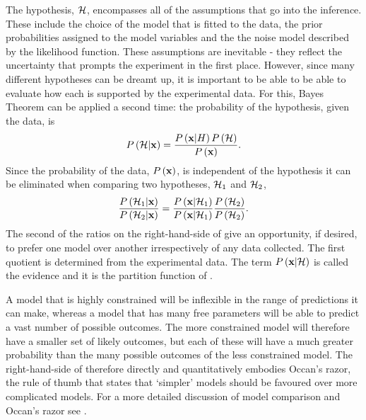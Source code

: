 The hypothesis, ${\cal H}$,  encompasses all of the assumptions that go into the inference.
These include the choice of the model that is fitted to the data, 
the prior probabilities assigned to the model variables and the 
the noise model described by the likelihood function.
These assumptions are inevitable - they reflect the uncertainty 
that prompts the experiment in the first place.
However, 
since many different hypotheses can be dreamt up,
it is important to be able to be able to evaluate how each is supported by the experimental data.
For this, Bayes Theorem can be applied a second time:
the probability of the hypothesis, given the data, is
\begin{align}
P\left( {\cal H} | \mathbf{x}  \right) = \frac{P\left( \mathbf{x}|H \right)P\left( {\cal H} \right)}{P\left( \mathbf{x} \right)}.
\label{eqn:BayesHyp}
\end{align}
Since the probability of the data, $P\left( \mathbf{x} \right)$, 
is independent of the hypothesis
it can be eliminated when comparing two hypotheses, ${\cal H}_1$ and ${\cal H}_2$,
\begin{align}
\frac{P\left( {\cal H}_1 | \mathbf{x}  \right)}{P\left( {\cal H}_2 | \mathbf{x}  \right)} = \frac{P\left( \mathbf{x}|{\cal H}_1 \right)}{P\left( \mathbf{x}|{\cal H}_1 \right)}\frac{P\left( {\cal H}_2 \right)}{P\left( {\cal H}_2 \right)}.
\label{eqn:ModelCmp}
\end{align}
The second of the ratios on the right-hand-side of 
give an opportunity, if desired, to prefer one model over another irrespectively of any data collected.
The first quotient is determined from the experimental data.
The term $P\left( \mathbf{x}|{\cal H} \right)$ is called the evidence and it is the partition function of  .

A model that is highly constrained will be inflexible in the range of predictions it can make,
whereas a model that has many free parameters will be able to predict a vast number of possible outcomes.
The more constrained model will therefore have a smaller set of likely outcomes,
but each of these will have a much greater probability than the many possible outcomes of the less constrained model.
The right-hand-side of  therefore directly and quantitatively  embodies Occan's razor,
the rule of thumb that states that `simpler' models should be favoured over more complicated models.
For a more detailed discussion of model comparison and Occan's razor see \cite{MacKay2003}.


